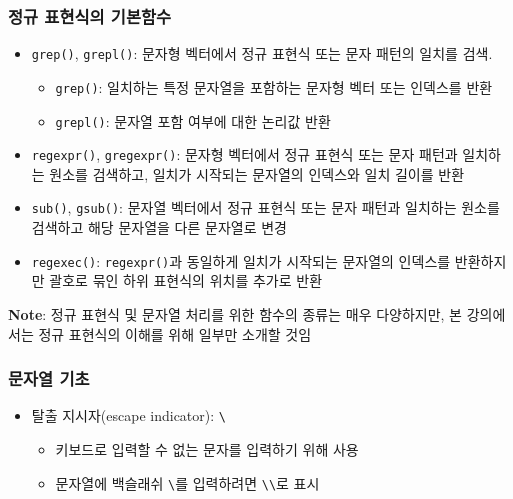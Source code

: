 \documentclass[
  11pt,
]{krantz}
\makeatletter
\providecommand{\tightlist}{%
  \setlength{\itemsep}{0pt}\setlength{\parskip}{0pt}}
\newenvironment{kframe}{%
\medskip{}
\setlength{\fboxsep}{.8em}
 \def\at@end@of@kframe{}%
 \ifinner\ifhmode%
  \def\at@end@of@kframe{\end{minipage}}%
  \begin{minipage}{\columnwidth}%
 \fi\fi%
 \def\FrameCommand##1{\hskip\@totalleftmargin \hskip-\fboxsep
 \colorbox{shadecolor}{##1}\hskip-\fboxsep
     \hskip-\linewidth \hskip-\@totalleftmargin \hskip\columnwidth}%
 \MakeFramed {\advance\hsize-\width
   \@totalleftmargin\z@ \linewidth\hsize
   \@setminipage}}%
 {\par\unskip\endMakeFramed%
 \at@end@of@kframe}
\renewenvironment{quote}{\begin{kframe}}{\end{kframe}}
\makeatother
\begin{document}
\hypertarget{regex-prim-fun}{%
\subsubsection*{\texorpdfstring{\textbf{정규 표현식의 기본함수}}{정규 표현식의 기본함수}}\label{regex-prim-fun}}


\begin{itemize}
\item
  \texttt{grep()}, \texttt{grepl()}: 문자형 벡터에서 정규 표현식 또는 문자 패턴의 일치를 검색.

  \begin{itemize}
  \tightlist
  \item
    \texttt{grep()}: 일치하는 특정 문자열을 포함하는 문자형 벡터 또는 인덱스를 반환
  \item
    \texttt{grepl()}: 문자열 포함 여부에 대한 논리값 반환
  \end{itemize}
\item
  \texttt{regexpr()}, \texttt{gregexpr()}: 문자형 벡터에서 정규 표현식 또는 문자 패턴과 일치하는 원소를 검색하고, 일치가 시작되는 문자열의 인덱스와 일치 길이를 반환
\item
  \texttt{sub()}, \texttt{gsub()}: 문자열 벡터에서 정규 표현식 또는 문자 패턴과 일치하는 원소를 검색하고 해당 문자열을 다른 문자열로 변경
\item
  \texttt{regexec()}: \texttt{regexpr()}과 동일하게 일치가 시작되는 문자열의 인덱스를 반환하지만 괄호로 묶인 하위 표현식의 위치를 추가로 반환
\end{itemize}

\begin{quote}
\textbf{Note}: 정규 표현식 및 문자열 처리를 위한 함수의 종류는 매우 다양하지만, 본 강의에서는 정규 표현식의 이해를 위해 일부만 소개할 것임
\end{quote}

\hypertarget{string-basic}{%
\subsubsection*{\texorpdfstring{\textbf{문자열 기초}}{문자열 기초}}\label{string-basic}}


\begin{itemize}
\tightlist
\item
  탈출 지시자(escape indicator): \texttt{\textbackslash{}}

  \begin{itemize}
  \tightlist
  \item
    키보드로 입력할 수 없는 문자를 입력하기 위해 사용
  \item
    문자열에 백슬래쉬 \texttt{\textbackslash{}}를 입력하려면 \texttt{\textbackslash{}\textbackslash{}}로 표시
  \end{itemize}
\end{itemize}
\end{document}
